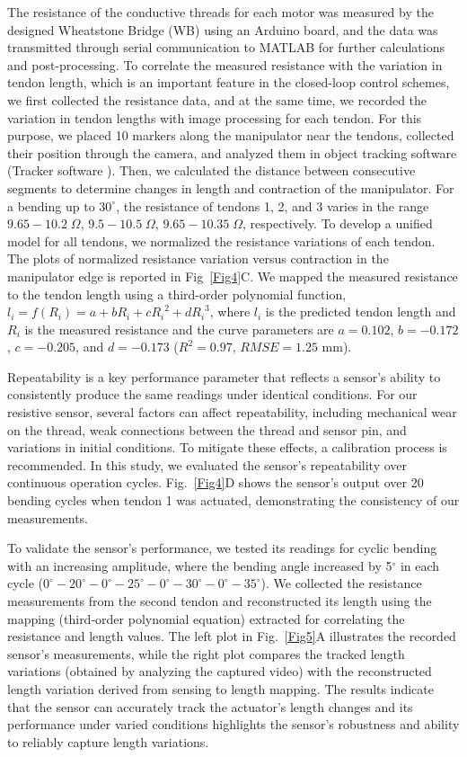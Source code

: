 \documentclass[journal, letterpaper]{IEEEtran}
\begin{document}
The resistance of the conductive threads for each motor was measured by the designed Wheatstone Bridge (WB) using an Arduino board, and the data was transmitted through serial communication to MATLAB for further calculations and post-processing. To correlate the measured resistance with the variation in tendon length, which is an important feature in the closed-loop control schemes, we first collected the resistance data, and at the same time, we recorded the variation in tendon lengths with image processing for each tendon.
For this purpose, we placed 10 markers along the manipulator near the tendons, collected their position through the camera, and analyzed them in object tracking software (Tracker software \cite{Brown2010}).  
Then, we calculated the distance between consecutive segments to determine changes in length and contraction of the manipulator. For a bending up to $30^\circ$, the resistance of tendons 1, 2, and 3 varies in the range $9.65-10.2 \; \Omega$, $9.5-10.5 \;\Omega$, $9.65-10.35\;\Omega$, respectively. To develop a unified model for all tendons, we normalized the resistance variations of each tendon. 
The plots of normalized resistance variation versus contraction in the manipulator edge is reported in Fig~\ref{Fig4}C.
We mapped the measured resistance to the tendon length using a third-order polynomial function, $  l_i=f(R_i)= a + b {R_i} + c {R_i}^2 + d {R_i}^3$, where $l_i$ is the predicted tendon length and $R_i$ is the measured resistance and the curve parameters are $a=0.102$, $b=-0.172$, $c=-0.205$, and $d=-0.173$  ($R^2=0.97$, $RMSE=1.25$ mm).



Repeatability is a key performance parameter that reflects a sensor's ability to consistently produce the same readings under identical conditions. For our resistive sensor, several factors can affect repeatability, including mechanical wear on the thread, weak connections between the thread and sensor pin, and variations in initial conditions. To mitigate these effects, a calibration process is recommended. In this study, we evaluated the sensor's repeatability over continuous operation cycles. Fig.~\ref{Fig4}D shows the sensor's output over 20 bending cycles when tendon 1 was actuated, demonstrating the consistency of our measurements.


To validate the sensor's performance, we tested its readings for cyclic bending with an increasing amplitude, where the bending angle increased by 5$^\circ$ in each cycle ($0^\circ-20^\circ-0^\circ-25^\circ-0^\circ-30^\circ-0^\circ-35^\circ$). We collected the resistance measurements from the second tendon and reconstructed its length using the mapping (third-order polynomial equation) extracted for correlating the resistance and length values. The left plot in Fig.~\ref{Fig5}A illustrates the recorded sensor's measurements, while the right plot compares the tracked length variations (obtained by analyzing the captured video) with the reconstructed length variation derived from sensing to length mapping. The results indicate that the sensor can accurately track the actuator's length changes and its performance under varied conditions highlights the sensor's robustness and ability to reliably capture length variations.
\end{document}
